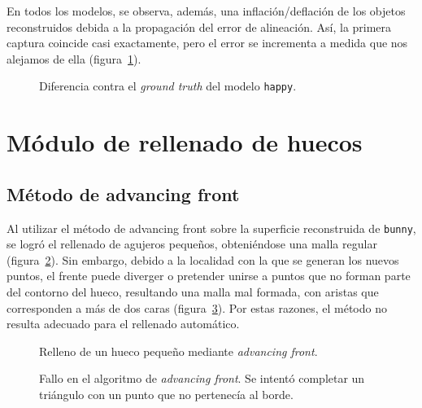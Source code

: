 	

	En todos los modelos, se observa, además, una inflación/deflación de los objetos
	reconstruidos debida a la propagación del error de alineación.  Así, la
	primera captura coincide casi exactamente, pero el error se incrementa
	a medida que nos alejamos de ella (figura~\ref{fig:fus_happy}).

	\begin{figure}
		\caption[Medida de error en la fusión]{\label{fig:fus_happy}Diferencia contra el \emph{ground truth} del modelo \texttt{happy}.}
	\end{figure}

	\section{Módulo de rellenado de huecos}
		\subsection{Método de advancing front}
		Al utilizar el método de advancing front sobre la superficie reconstruida de \texttt{bunny},
		se logró el rellenado de agujeros pequeños, obteniéndose una malla regular (figura~\ref{fig:fill_good}).
		Sin embargo, debido a la localidad con la que se generan los nuevos
		puntos, el frente puede diverger o pretender unirse a puntos que no
		forman parte del contorno del hueco, resultando una malla mal formada,
		con aristas que corresponden a más de dos caras (figura~\ref{fig:fill_bad}).
		Por estas razones, el método no resulta adecuado para el rellenado automático.


		\begin{figure}
			\caption[Relleno de un hueco pequeño mediante \emph{advancing front}]
			{\label{fig:fill_good}Relleno de un hueco pequeño mediante \emph{advancing front}.}
		\end{figure}

		\begin{figure}
			\caption[Fallo en el algoritmo de \emph{advancing front}]
			{\label{fig:fill_bad}Fallo en el algoritmo de \emph{advancing front}.
			Se intentó completar un triángulo con un punto que no pertenecía al borde.}
		\end{figure}

